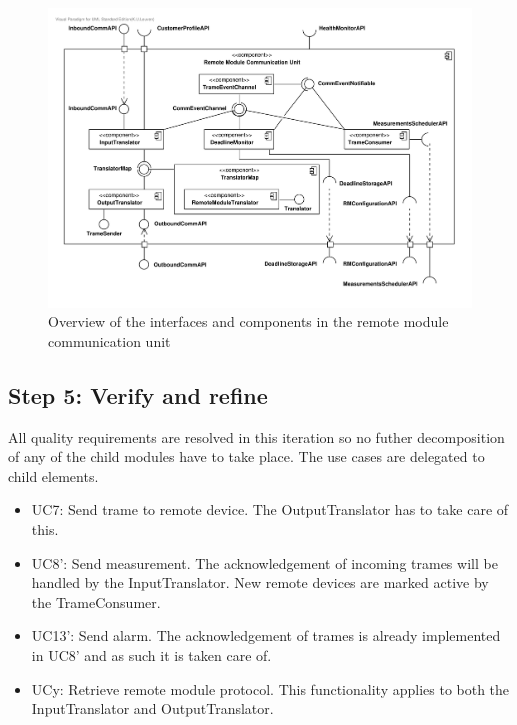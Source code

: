 \begin{figure}[H]
	\begin{centering}
		\includegraphics[width=\textwidth]{figs/add-it2-interfaces.pdf}
		\caption{Overview of the interfaces and components in the remote
		module communication unit}
		\label{fig:it2/interfaces}
	\end{centering}
\end{figure}

\subsection{Step 5: Verify and refine}
\label{add:it2/verification}

\npar All quality requirements are resolved in this iteration so no futher
decomposition of any of the child modules have to take place. The use cases
are delegated to child elements. 

\begin{itemize}
	\item UC7: Send trame to remote device. The OutputTranslator has to take care
	of this. 
  	\item UC8': Send measurement. The acknowledgement of incoming trames will
  	be handled by the InputTranslator. New remote devices are marked active by
  	the TrameConsumer. 
  	\item UC13': Send alarm. The acknowledgement of trames is already implemented
  	in UC8' and as such it is taken care of.
  	\item UCy: Retrieve remote module protocol. This functionality applies to
  	both the InputTranslator and OutputTranslator. 
\end{itemize}

